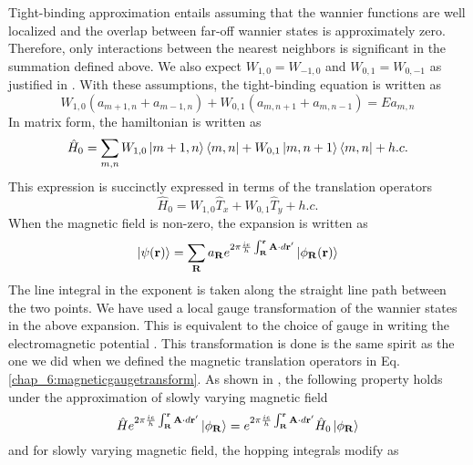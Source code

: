 Tight-binding approximation entails assuming that the wannier functions are well localized and the overlap between far-off wannier states is approximately zero. Therefore, 
only interactions between the nearest neighbors is significant in the summation defined above. We also expect $W_{1, 0} = W_{-1, 0}$ and $W_{0, 1} = W_{0, -1}$ as justified in \parencite{stockmann2006quantum}.
With these assumptions, the tight-binding equation is written as
\begin{equation}
 W_{1,0}(a_{m+1, n} + a_{m-1, n}) + W_{0, 1}(a_{m, n+1} + a_{m, n-1}) = Ea_{m, n}
\end{equation} In matrix form, the hamiltonian is written as
\begin{equation}
\hat{H}_{0} = \sum_{m,n} W_{1,0}\ket{m+1, n}\bra{m, n} + W_{0,1}\ket{m, n+1}\bra{m, n} + h.c.
\end{equation}
This expression is succinctly expressed in terms of the translation operators
\begin{equation}
  \hat{H}_{0} = W_{1,0}\hat{T}_{x} + W_{0,1}\hat{T}_{y} + h.c.
\end{equation}
When the magnetic field is non-zero, the expansion is written as \cite{luttinger1951effect, wannier1962dynamics, stockmann2006quantum,bernevig2013topological}
\begin{align}
  \ket{\psi(\mathbf{r})} = \sum_{\mathbf{R}}{a_{\mathbf{R}} e^{2\pi \frac{ie}{h}\int_{\mathbf{R}}^{\mathbf{r}}{\mathbf{A}\cdot d\mathbf{r}'}}\ket{\phi_{\mathbf{R}}(\mathbf{r})}}
\end{align}
The line integral in the exponent is taken along the straight line path between the two points. We have used a local gauge transformation of the wannier states in the above expansion.
This is equivalent to the choice of gauge in writing the electromagnetic potential \cite{sakurai2011modern,kitel1971introduction,moriyasu1983elementary}. This transformation is done is the same
spirit as the one we did when we defined the magnetic translation operators in Eq. \eqref{chap_6:magneticgaugetransform}. As shown in \parencite{luttinger1951effect},
the following property holds under the approximation of slowly varying magnetic field
\begin{equation}
 \hat{H}e^{2\pi \frac{ie}{h}\int_{\mathbf{R}}^{\mathbf{r}}{\mathbf{A}\cdot d\mathbf{r}'}}\ket{\phi_{\mathbf{R}}} = e^{2\pi \frac{ie}{h}\int_{\mathbf{R}}^{\mathbf{r}}{\mathbf{A}\cdot d\mathbf{r}'}}\hat{H}_{0}\ket{\phi_{\mathbf{R}}}
\end{equation} and for slowly varying magnetic field, the hopping integrals modify as
